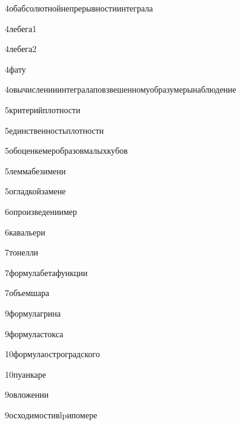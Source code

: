 {4}{обабсолютнойнепрерывностиинтеграла}

{4}{лебега1}

{4}{лебега2}

{4}{фату}

{4}{овычисленииинтегралаповзвешенномуобразумерынаблюдение}

{5}{критерийплотности}

{5}{единственностьплотности}

{5}{обоценкемеробразовмалыхкубов}

{5}{леммабезимени}

{5}{огладкойзамене}

{6}{опроизведениимер}

{6}{кавальери}

{7}{тонелли}

{7}{формулабетафункции}

{7}{объемшара}

{9}{формулагрина}

{9}{формуластокса}

{10}{формулаостроградского}

{10}{пуанкаре}

{9}{овложении}

{9}{осходимостивlpипомере}

